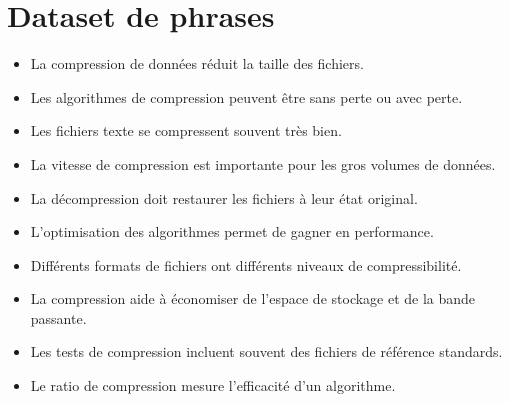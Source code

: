 \documentclass{article}
\begin{document}
	
	\section*{Dataset de phrases}
	
	\begin{itemize}
		\item La compression de données réduit la taille des fichiers.
		\item Les algorithmes de compression peuvent être sans perte ou avec perte.
		\item Les fichiers texte se compressent souvent très bien.
		\item La vitesse de compression est importante pour les gros volumes de données.
		\item La décompression doit restaurer les fichiers à leur état original.
		\item L’optimisation des algorithmes permet de gagner en performance.
		\item Différents formats de fichiers ont différents niveaux de compressibilité.
		\item La compression aide à économiser de l’espace de stockage et de la bande passante.
		\item Les tests de compression incluent souvent des fichiers de référence standards.
		\item Le ratio de compression mesure l’efficacité d’un algorithme.
	\end{itemize}
	
\end{document}
